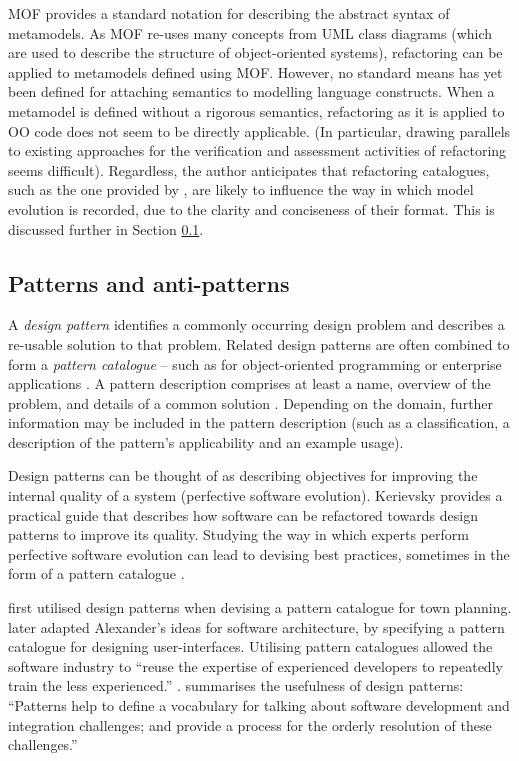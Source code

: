 MOF \cite{mof} provides a standard notation for describing the abstract syntax of metamodels. As MOF re-uses many concepts from UML class diagrams (which are used to describe the structure of object-oriented systems), refactoring can be applied to metamodels defined using MOF. However, no standard means has yet been defined for attaching semantics to modelling language constructs. When a metamodel is defined without a rigorous semantics, refactoring as it is applied to OO code does not seem to be directly applicable. (In particular, drawing parallels to existing approaches for the verification and assessment activities of refactoring seems difficult). Regardless, the author anticipates that refactoring catalogues, such as the one provided by \cite{fowler99refactoring}, are likely to influence the way in which model evolution is recorded, due to the clarity and conciseness of their format. This is discussed further in Section \ref{sec:LitReviewPatterns}.


\subsection{Patterns and anti-patterns}
\label{sec:LitReviewPatterns}
A \textit{design pattern} identifies a commonly occurring design problem and describes a re-usable solution to that problem. Related design patterns are often combined to form a \textit{pattern catalogue} -- such as for object-oriented programming \cite{gamma95patterns} or enterprise applications \cite{fowler02patterns}. A pattern description comprises at least a name, overview of the problem, and details of a common solution \cite{brown98antipatterns}. Depending on the domain, further information may be included in the pattern description (such as a classification, a description of the pattern's applicability and an example usage).

Design patterns can be thought of as describing objectives for improving the internal quality of a system (perfective software evolution). Kerievsky \cite{kerievsky04refactoring} provides a practical guide that describes how software can be refactored towards design patterns to improve its quality. Studying the way in which experts perform perfective software evolution can lead to devising best practices, sometimes in the form of a pattern catalogue \cite{fowler99refactoring}.

\cite{alexander77pattern} first utilised design patterns when devising a pattern catalogue for town planning. \cite{beck89constructing} later adapted Alexander's ideas for software architecture, by specifying a pattern catalogue for designing user-interfaces. Utilising pattern catalogues allowed the software industry to ``reuse the expertise of experienced developers to repeatedly train the less experienced.'' \cite[pg10]{brown98antipatterns}. \cite[pg xii]{rising01designpatterns} summarises the usefulness of design patterns: ``Patterns help to define a vocabulary for talking about software development and integration challenges; and provide a process for the orderly resolution of these challenges.'' 

